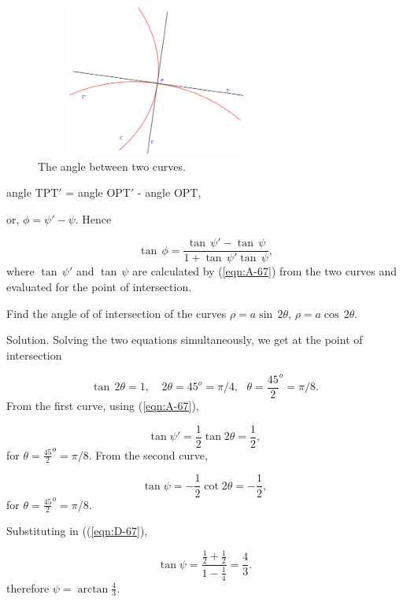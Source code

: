 \begin{figure}[h!]
\begin{minipage}{\textwidth}
\begin{center}
\includegraphics[height=5cm,width=8cm]{curves-intersect2.eps}
\end{center}
\end{minipage}
\caption{The angle between two curves.}
\label{fig:curves-angle}
\end{figure}

\begin{center}
angle TPT$'$ = angle OPT$'$ - angle OPT,
\end{center}
or, $\phi = \psi' - \psi$. Hence

\begin{equation}
\ \tan\, \phi 	= \frac{\tan\, \psi' - \tan\, \psi}{1 + \tan\, \psi' \tan\, \psi},
\label{eqn:D-67}
\end{equation}	
where $\tan\, \psi'$ and $\tan\, \psi$ are calculated by (\ref{eqn:A-67}) 
from the two curves and evaluated for the point of intersection.

\begin{example}
{\rm
Find the angle of of intersection of the curves 
$\rho = a\sin\, 2\theta$, $\rho = a\cos\, 2\theta$.

Solution. Solving the two equations simultaneously, we get at the point of intersection

\[
 \tan\, 2\theta = 1, \,\ \ \ \  2\theta = 45^o=\pi/4,\ \ \  \theta = \frac{45}{2}^o=\pi/8.
\]
From the first curve, using (\ref{eqn:A-67}),

\[
    \tan \psi' = \frac{1}{2} \tan 2 \theta = \frac{1}{2}, 
\]
for $\theta = \frac{45}{2}^o=\pi/8$.
From the second curve,

\[
\tan \psi = -\frac{1}{2} \cot 2 \theta = -\frac{1}{2}, 
\]
for $\theta = \frac{45}{2}^o=\pi/8$.

Substituting in ((\ref{eqn:D-67}),

\[
   \tan \psi = \frac{ \frac{1}{2} + \frac{1}{2} }{ 1 - \frac{1}{4} } 
= \frac{4}{3}. 
\]
therefore $\psi = \arctan \frac{4}{3}$. 
}
\end{example}


